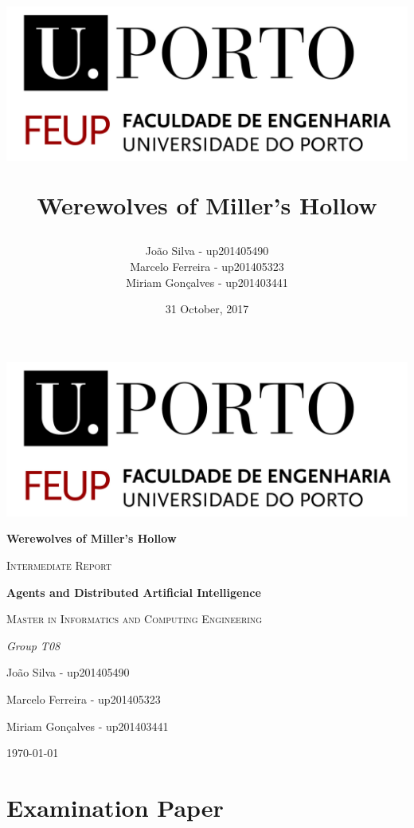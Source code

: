 \documentclass{article}
\title{ \begin{center}
					\includegraphics[scale=0.6]{FEUPlogo}
				\end{center}
				\textbf{Werewolves of Miller's Hollow}}
\author{João Silva - up201405490\\
		Marcelo Ferreira - up201405323\\
		Miriam Gonçalves - up201403441}
\date{31 October, 2017}
\begin{document}
\begin{titlepage}
	\centering
	\includegraphics[width=1\textwidth]{FEUPlogo}\par\vspace{1cm}
	{\huge\bfseries Werewolves of Miller's Hollow \par}
	\vspace{2cm}
	{\scshape\Large Intermediate Report\par}
	\vspace{1.5cm}
	{\large\bfseries Agents and Distributed Artificial Intelligence\par}
	\vspace{0.7cm}
	{\scshape\normalsize  Master in Informatics and Computing Engineering \par}
	\vspace{1.5cm}
	{\Large\itshape Group T08 \par João Silva - up201405490 \par
	Marcelo Ferreira - up201405323 \par
	Miriam Gonçalves - up201403441\par}

	\vfill
	{\large \today\par}
\end{titlepage}
\thispagestyle{empty}

\newpage

\tableofcontents

\newpage

\section{Examination Paper}
\end{document}
